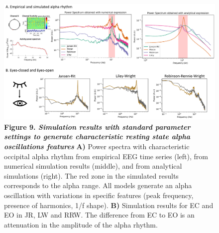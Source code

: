 \documentclass[12pt,twoside]{article}
\begin{document}

\begin{figure}[H]
    \hspace{-1cm}
    \includegraphics[scale=0.5]{Images/Figure_alpha_2.png}
    \caption*{\textbf{Figure 9.  \textit{Simulation results with standard parameter settings to generate characteristic resting state alpha oscillations features}} \textbf{A)} Power spectra with characteristic occipital alpha rhythm from empirical EEG time series (left), from numerical simulation results (middle), and from analytical simulations (right). The red zone in the simulated results corresponds to the alpha range. All models generate an alpha oscillation with variations in specific features (peak frequency, presence of harmonics, 1/f shape). \textbf{B)} Simulation results for EC and EO in JR, LW and RRW. The difference from EC to EO is an attenuation in the amplitude of the alpha rhythm.}
    \label{fig:Alpha_results}
\end{figure}
\end{document}

